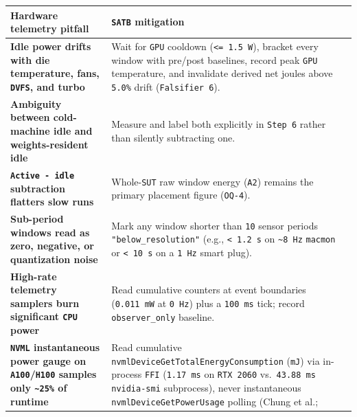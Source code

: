 \documentclass[10pt,letterpaper]{article}
\begin{document}
{\footnotesize\setlength{\tabcolsep}{3.8pt}\renewcommand{\arraystretch}{1.15}
\begin{longtable}[]{@{}
  >{\raggedright\arraybackslash}p{}
  >{\raggedright\arraybackslash}p{}@{}}
\toprule\noalign{}
\begin{minipage}[b]{\linewidth}\raggedright
\textbf{Hardware telemetry pitfall}
\end{minipage} & \begin{minipage}[b]{\linewidth}\raggedright
\textbf{\texttt{SATB} mitigation}
\end{minipage} \\
\midrule\noalign{}
\endhead
\bottomrule\noalign{}
\endlastfoot
\textbf{Idle power drifts with die temperature, fans, \texttt{DVFS}, and
turbo} & Wait for \texttt{GPU} cooldown (\texttt{\textless{}=\ 1.5\ W}),
bracket every window with pre/post baselines, record peak \texttt{GPU}
temperature, and invalidate derived net joules above \texttt{5.0\%}
drift (\texttt{Falsifier\ 6}). \\
\textbf{Ambiguity between cold-machine idle and weights-resident idle} &
Measure and label both explicitly in \texttt{Step\ 6} rather than
silently subtracting one. \\
\textbf{\texttt{Active\ -\allowbreak{}\ idle} subtraction flatters slow runs} &
Whole-\texttt{SUT} raw window energy (\texttt{A2}) remains the primary
placement figure (\texttt{OQ-4}). \\
\textbf{Sub-period windows read as zero, negative, or quantization
noise} & Mark any window shorter than \texttt{10} sensor periods
\texttt{"below\_\allowbreak{}resolution"} (e.g., \texttt{\textless{}\ 1.2\ s} on
\texttt{\textasciitilde{}8\ Hz} \texttt{macmon} or
\texttt{\textless{}\ 10\ s} on a \texttt{1\ Hz} smart plug). \\
\textbf{High-rate telemetry samplers burn significant \texttt{CPU}
power} & Read cumulative counters at event boundaries
(\texttt{0.011\ mW} at \texttt{0\ Hz}) plus a \texttt{100\ ms} tick;
record \texttt{observer\_\allowbreak{}only} baseline. \\
\textbf{\texttt{NVML} instantaneous power gauge on
\texttt{A100}/\allowbreak{}\texttt{H100} samples only \texttt{\textasciitilde{}25\%}
of runtime} & Read cumulative
\texttt{nvmlDeviceGetTotalEnergyConsumption} (\texttt{mJ}) via
in-process \texttt{FFI} (\texttt{1.17\ ms} on \texttt{RTX\ 2060}
vs.~\texttt{43.88\ ms} \texttt{nvidia-\allowbreak{}smi} subprocess), never
instantaneous \texttt{nvmlDeviceGetPowerUsage} polling (Chung et al.;

\end{longtable}}
\end{document}
